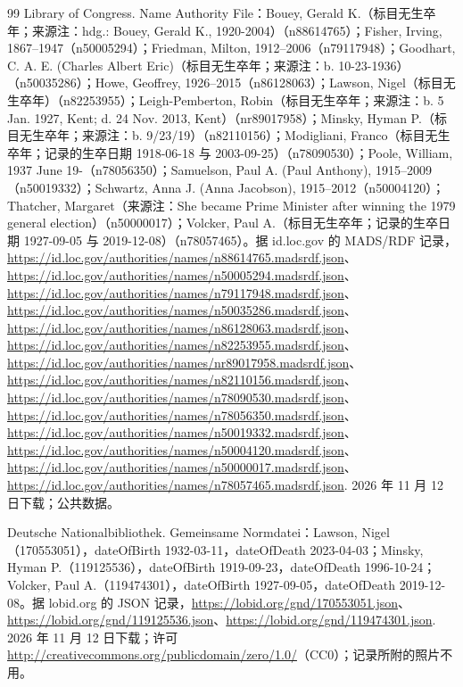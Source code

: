 \begin{thebibliography}{99}
 Library of Congress. Name Authority File：Bouey, Gerald K.（标目无生卒年；来源注：hdg.: Bouey, Gerald K., 1920-2004）（n88614765）；Fisher, Irving, 1867--1947（n50005294）；Friedman, Milton, 1912--2006（n79117948）；Goodhart, C. A. E. (Charles Albert Eric)（标目无生卒年；来源注：b. 10-23-1936）（n50035286）；Howe, Geoffrey, 1926--2015（n86128063）；Lawson, Nigel（标目无生卒年）（n82253955）；Leigh-Pemberton, Robin（标目无生卒年；来源注：b. 5 Jan. 1927, Kent; d. 24 Nov. 2013, Kent）（nr89017958）；Minsky, Hyman P.（标目无生卒年；来源注：b. 9/23/19）（n82110156）；Modigliani, Franco（标目无生卒年；记录的生卒日期 1918-06-18 与 2003-09-25）（n78090530）；Poole, William, 1937 June 19-（n78056350）；Samuelson, Paul A. (Paul Anthony), 1915--2009（n50019332）；Schwartz, Anna J. (Anna Jacobson), 1915--2012（n50004120）；Thatcher, Margaret（来源注：She became Prime Minister after winning the 1979 general election）（n50000017）；Volcker, Paul A.（标目无生卒年；记录的生卒日期 1927-09-05 与 2019-12-08）（n78057465）。据 id.loc.gov 的 MADS/RDF 记录，\url{https://id.loc.gov/authorities/names/n88614765.madsrdf.json}、\url{https://id.loc.gov/authorities/names/n50005294.madsrdf.json}、\url{https://id.loc.gov/authorities/names/n79117948.madsrdf.json}、\url{https://id.loc.gov/authorities/names/n50035286.madsrdf.json}、\url{https://id.loc.gov/authorities/names/n86128063.madsrdf.json}、\url{https://id.loc.gov/authorities/names/n82253955.madsrdf.json}、\url{https://id.loc.gov/authorities/names/nr89017958.madsrdf.json}、\url{https://id.loc.gov/authorities/names/n82110156.madsrdf.json}、\url{https://id.loc.gov/authorities/names/n78090530.madsrdf.json}、\url{https://id.loc.gov/authorities/names/n78056350.madsrdf.json}、\url{https://id.loc.gov/authorities/names/n50019332.madsrdf.json}、\url{https://id.loc.gov/authorities/names/n50004120.madsrdf.json}、\url{https://id.loc.gov/authorities/names/n50000017.madsrdf.json}、\url{https://id.loc.gov/authorities/names/n78057465.madsrdf.json}. 2026 年 11 月 12 日下载；公共数据。

 Deutsche Nationalbibliothek. Gemeinsame Normdatei：Lawson, Nigel（170553051），dateOfBirth 1932-03-11，dateOfDeath 2023-04-03；Minsky, Hyman P.（119125536），dateOfBirth 1919-09-23，dateOfDeath 1996-10-24；Volcker, Paul A.（119474301），dateOfBirth 1927-09-05，dateOfDeath 2019-12-08。据 lobid.org 的 JSON 记录，\url{https://lobid.org/gnd/170553051.json}、\url{https://lobid.org/gnd/119125536.json}、\url{https://lobid.org/gnd/119474301.json}. 2026 年 11 月 12 日下载；许可 \url{http://creativecommons.org/publicdomain/zero/1.0/}（CC0）；记录所附的照片不用。


\end{thebibliography}
